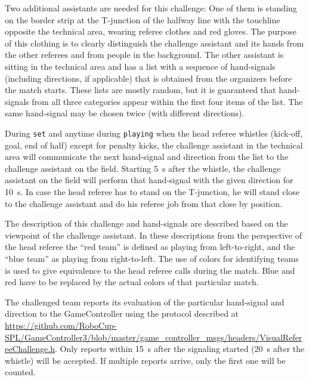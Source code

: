 Two additional assistants are needed for this challenge:
One of them is standing on the border strip at the T-junction of the halfway line with the touchline opposite the technical area, wearing referee clothes and red gloves.
The purpose of this clothing is to clearly distinguish the challenge assistant and its hands from the other referees and from people in the background.
The other assistant is sitting in the technical area and has a list with a sequence of hand-signals (including directions, if applicable) that is obtained from the organizers before the match starts.
These lists are mostly random, but it is guaranteed that hand-signals from all three categories appear within the first four items of the list.
The same hand-signal may be chosen twice (with different directions). %

During \texttt{set} and anytime during \texttt{playing} when the head referee whistles (kick-off, goal, end of half) except for penalty kicks, the challenge assistant in the technical area will communicate the next hand-signal and direction from the list to the challenge assistant on the field.
Starting \qty{5}{\second} after the whistle, the challenge assistant on the field will perform that hand-signal with the given direction for \qty{10}{\second}.
In case the head referee has to stand on the T-junction, he will stand close to the challenge assistant and do his referee job from that close by position.

The description of this challenge and hand-signals are described based on the viewpoint of the challenge assistant. In these descriptions from the perspective of the head referee the ``red team'' is defined as playing from left-to-right, and the ``blue team'' as playing from right-to-left. The use of colors for identifying teams is used to give equivalence to the head referee calls during the match. Blue and red have to be replaced by the actual colors of that particular match. %

The challenged team reports its evaluation of the particular hand-signal and direction to the GameController using the protocol described at \url{https://github.com/RoboCup-SPL/GameController3/blob/master/game_controller_msgs/headers/VisualRefereeChallenge.h}.
Only reports within \qty{15}{\second} after the signaling started (\ie \qty{20}{\second} after the whistle) will be accepted.
If multiple reports arrive, only the first one will be counted.

